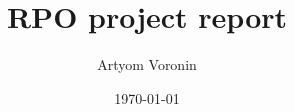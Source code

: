 \documentclass[11pt]{book}
\title{RPO project report}
\author{Artyom Voronin}
\date{\today}
\begin{document}
\maketitle	

\tableofcontents


\pagebreak    


\pagebreak    


\pagebreak    


\pagebreak    




\end{document}
